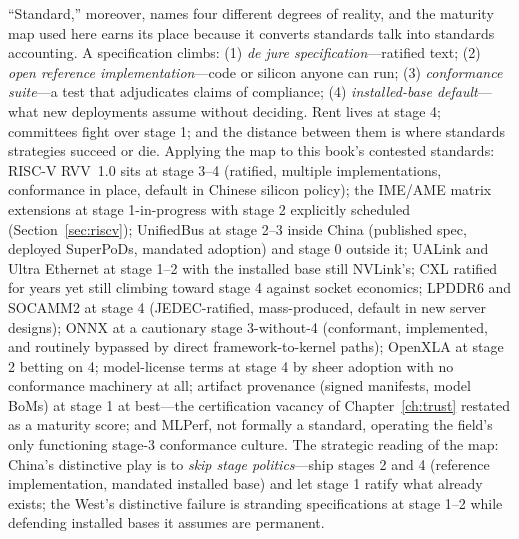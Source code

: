 ``Standard,'' moreover, names four different degrees of reality, and the maturity map used here earns its place because it converts standards talk into standards accounting. A specification climbs: (1) \emph{de jure specification}---ratified text; (2) \emph{open reference implementation}---code or silicon anyone can run; (3) \emph{conformance suite}---a test that adjudicates claims of compliance; (4) \emph{installed-base default}---what new deployments assume without deciding. Rent lives at stage 4; committees fight over stage 1; and the distance between them is where standards strategies succeed or die. Applying the map to this book's contested standards: RISC-V RVV~1.0 sits at stage 3--4 (ratified, multiple implementations, conformance in place, default in Chinese silicon policy); the IME/AME matrix extensions at stage 1-in-progress with stage 2 explicitly scheduled (Section~\ref{sec:riscv}); UnifiedBus at stage 2--3 inside China (published spec, deployed SuperPoDs, mandated adoption) and stage 0 outside it; UALink and Ultra Ethernet at stage 1--2 with the installed base still NVLink's; CXL ratified for years yet still climbing toward stage 4 against socket economics; LPDDR6 and SOCAMM2 at stage 4 (JEDEC-ratified, mass-produced, default in new server designs); ONNX at a cautionary stage 3-without-4 (conformant, implemented, and routinely bypassed by direct framework-to-kernel paths); OpenXLA at stage 2 betting on 4; model-license terms at stage 4 by sheer adoption with no conformance machinery at all; artifact provenance (signed manifests, model BoMs) at stage 1 at best---the certification vacancy of Chapter~\ref{ch:trust} restated as a maturity score; and MLPerf, not formally a standard, operating the field's only functioning stage-3 conformance culture. The strategic reading of the map: China's distinctive play is to \emph{skip stage politics}---ship stages 2 and 4 (reference implementation, mandated installed base) and let stage 1 ratify what already exists; the West's distinctive failure is stranding specifications at stage 1--2 while defending installed bases it assumes are permanent.


